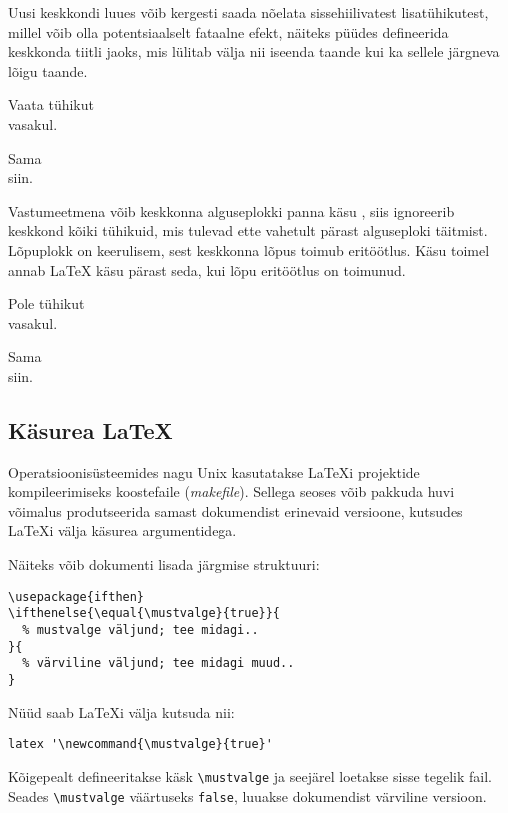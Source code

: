 Uusi keskkondi luues võib kergesti saada nõelata sissehiilivatest
lisatühikutest, millel võib olla potentsiaalselt fataalne efekt, näiteks
püüdes defineerida keskkonda tiitli jaoks, mis lülitab välja nii iseenda
taande kui ka sellele järgneva lõigu taande.

\begin{example}
\newenvironment{lihtne}%
 {\noindent}%
 {\par\noindent}

\begin{lihtne}
Vaata tühikut\\vasakul.
\end{lihtne}
Sama\\siin.
\end{example}

Vastumeetmena võib keskkonna alguseplokki panna käsu ,
siis ignoreerib keskkond kõiki tühikuid, mis tulevad ette vahetult
pärast alguseploki täitmist. Lõpuplokk on keerulisem, sest keskkonna
lõpus toimub eritöötlus. Käsu  toimel annab
\LaTeX{} käsu  pärast seda, kui lõpu eritöötlus on
toimunud.

\begin{example}
\newenvironment{korrektne}%
 {\noindent\ignorespaces}%
 {\par\noindent%
   \ignorespacesafterend}

\begin{korrektne}
Pole tühikut\\vasakul.
\end{korrektne}
Sama\\siin.
\end{example}

\subsection{Käsurea \LaTeX}

Operatsioonisüsteemides nagu Unix kasutatakse \LaTeX i projektide
kompileerimiseks koostefaile (\emph{makefile}). Sellega seoses võib
pakkuda huvi võimalus produtseerida samast dokumendist erinevaid
versioone, kutsudes \LaTeX i välja käsurea argumentidega.

Näiteks võib dokumenti lisada järgmise struktuuri:
\begin{code}
\begin{verbatim}
\usepackage{ifthen}
\ifthenelse{\equal{\mustvalge}{true}}{
  % mustvalge väljund; tee midagi..
}{
  % värviline väljund; tee midagi muud..
}
\end{verbatim}
\end{code}
Nüüd saab \LaTeX i välja kutsuda nii:
\begin{lscommand}
\verb|latex '\newcommand{\mustvalge}{true}'|
\end{lscommand}
Kõigepealt defineeritakse käsk \verb|\mustvalge| ja seejärel loetakse
sisse tegelik fail. Seades \verb|\mustvalge| väärtuseks \verb|false|,
luuakse dokumendist värviline versioon.

